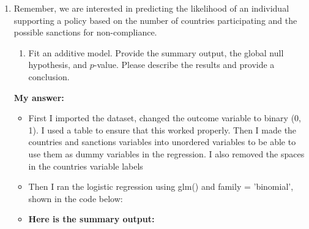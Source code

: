 \documentclass[12pt,letterpaper]{article}
\begin{document}
\begin{enumerate}
	\item
	Remember, we are interested in predicting the likelihood of an individual supporting a policy based on the number of countries participating and the possible sanctions for non-compliance.
	\begin{enumerate}
		\item [] Fit an additive model. Provide the summary output, the global null hypothesis, and $p$-value. Please describe the results and provide a conclusion.
	\end{enumerate}
	\textbf{My answer:}
	
	\begin{itemize}

	\item First I imported the dataset, changed the outcome variable to binary (0, 1). I used a table to ensure that this worked properly. Then I made the countries and sanctions variables into unordered variables to be able to use them as dummy variables in the regression. I also removed the spaces in the countries variable labels
	\item Then I ran the logistic regression using glm() and family = 'binomial', shown in the code below:
	
	
	
	\item \textbf{Here is the summary output:}
	

\end{itemize}
\end{enumerate}
\end{document}
